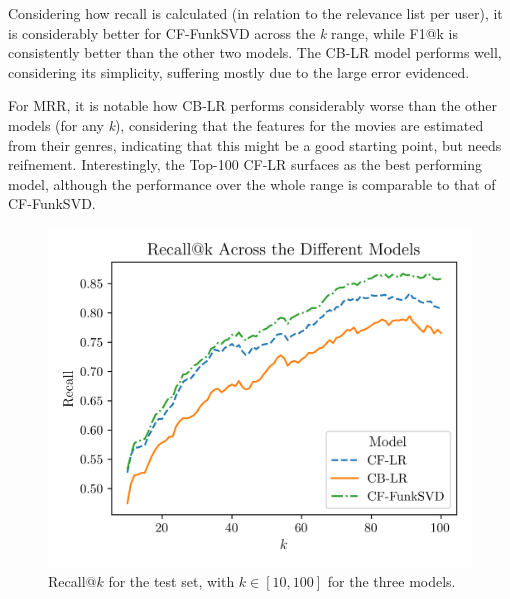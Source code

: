 \documentclass[conference]{IEEEtran}
\begin{document}
Considering how recall is calculated (in relation to the relevance list per user), it is considerably better for CF-FunkSVD across the \textit{k} range, while F1@k is consistently better than the other two models. The CB-LR model performs well, considering its simplicity, suffering mostly due to the large error evidenced. 

For MRR, it is notable how CB-LR performs considerably worse than the other models (for any \textit{k}), considering that the features for the movies are estimated from their genres, indicating that this might be a good starting point, but needs reifnement. Interestingly, the Top-100 CF-LR surfaces as the best performing model, although the performance over the whole range is comparable to that of CF-FunkSVD.

\begin{figure}[H]
    \centering
    \includegraphics[width=1\linewidth]{assets/results_recallK.png}
    \caption{Recall@$k$ for the test set, with $k \in [10,100]$ for the three models.}
    \label{fig:results_recallK}
\end{figure}
\end{document}
